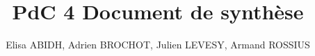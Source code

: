 \documentclass[a4paper]{article}
\begin{document}
\title{PdC 4 Document de synthèse }

\author{Elisa ABIDH, Adrien BROCHOT, Julien LEVESY, Armand ROSSIUS}

\maketitle


\newpage
\tableofcontents
\newpage


\end{document}
